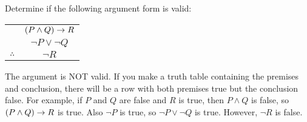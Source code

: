 \begin{questions}
  
\question Determine if the following argument form is valid: \begin{tabular}{rc} & $(P \wedge Q) \rightarrow R$ \\ & $\neg P \vee \neg Q$ \\ \hline $\therefore$ & $\neg R$\end{tabular}

  \begin{answer}
    The argument is NOT valid.  If you make a truth table containing the premises and conclusion, there will be a row with both premises true but the conclusion false.  For example, if $P$ and $Q$ are false and $R$ is true, then $P \wedge Q$ is false, so $(P \wedge Q) \rightarrow R$ is true.  Also $\neg P$ is true, so $\neg P \vee \neg Q$ is true.  However, $\neg R$ is false.
  \end{answer}




\end{questions}